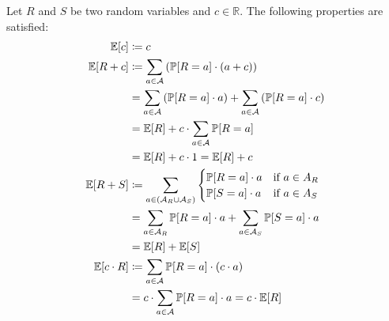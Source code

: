 Let $R$ and $S$ be two random variables and $c \in \mathbb R$.
The following properties are satisfied:
\begin{align}
  \mathbb E[c]     &\coloneqq c \\
  \mathbb E[R + c] &\coloneqq \sum_{a \in \mathcal A} \left(\mathbb P[R=a] \cdot (a + c)\right) \notag\\
            &= \sum_{a \in \mathcal A} \left(\mathbb P[R=a] \cdot a\right) + \sum_{a \in \mathcal A} \left(\mathbb P[R=a] \cdot c\right) \notag\\
            &= \mathbb E[R] + c \cdot \sum_{a \in \mathcal A} \mathbb P[R=a] \notag\\
            &= \mathbb E[R] + c \cdot 1 = \mathbb E[R] + c \\
  \mathbb E[R + S] &\coloneqq \sum_{a \in (\mathcal A_R \cup \mathcal A_S)}
              \begin{cases}
                \mathbb P[R=a] \cdot a & \text{if } a \in A_R \\
                \mathbb P[S=a] \cdot a & \text{if } a \in A_S
              \end{cases}\notag\\
            &= \sum_{a \in \mathcal A_R} \mathbb P[R=a] \cdot a + \sum_{a \in \mathcal A_S} \mathbb P[S=a] \cdot a \notag\\
            &= \mathbb E[R] + \mathbb E[S] \\
  \mathbb E[c \cdot R] &\coloneqq \sum_{a \in \mathcal A} \mathbb P[R=a] \cdot (c \cdot a) \notag\\
            &= c \cdot \sum_{a \in \mathcal A} \mathbb P[R=a] \cdot a = c \cdot \mathbb E[R]
\end{align}

